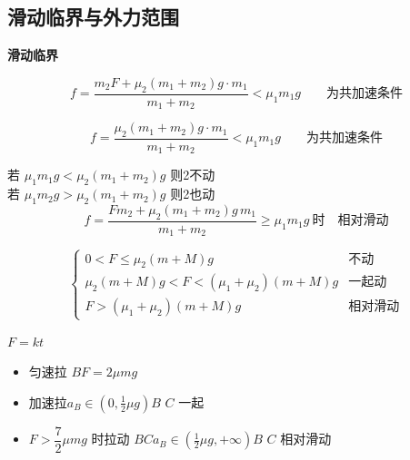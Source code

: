 \subsection{滑动临界与外力范围}
\textbf{滑动临界}

\[ f=\frac{m_2F+\mu_2(m_1+m_2)g\cdot m_1}{m_1+m_2}<\mu_1m_1g\qquad\text{为共加速条件} \]

\[ f=\frac{\mu_2(m_1+m_2)g\cdot m_1}{m_1+m_2}<\mu_1m_1g\qquad\text{为共加速条件} \]


\noindent 若 $\mu_1m_1g<\mu_2(m_1+m_2)g$ 则2不动 \\
若 $\mu_1m_2g>\mu_2(m_1+m_2)g$ 则2也动 %
\[ f=\frac{Fm_2+\mu_2(m_1+m_2)g\,m_1}{m_1+m_2}\ge\mu_1m_1g\ \text{时}\quad\text{相对滑动} \]


\[
\left\{\begin{array}{ll}
0<F\le\mu_2(m+M)g & \text{不动}\\
\mu_2(m+M)g<F<(\mu_1+\mu_2)(m+M)g & \text{一起动}\\
F>(\mu_1+\mu_2)(m+M)g & \text{相对滑动}
\end{array}\right.
\]

$F=kt$%

\begin{problem}
\begin{solution}
\begin{itemize}
\item 匀速拉 $B$\quad $F=2\mu mg$ %
\item 加速拉\quad $a_B\in(0,\tfrac12\mu g)$\quad $B$ $C$ 一起
\item $F>\dfrac{7}{2}\mu mg$ 时拉动 $B$$C$\quad $a_B\in(\tfrac12\mu g,+\infty)$\quad $B$ $C$ 相对滑动 %
\end{itemize}
\end{solution}
\end{problem}

